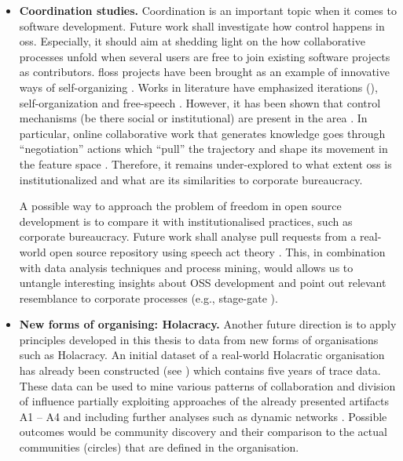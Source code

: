 \begin{itemize}
	\item{\bfseries Coordination studies.}
	Coordination is an important topic when it comes to software development. Future work shall investigate how control happens in \gls{oss}. Especially, it should aim at shedding light on the how collaborative processes unfold when several users are free to join existing software projects as contributors. \Gls{floss} projects have been brought as an example of innovative ways of self-organizing \citep{DBLP:journals/mansci/KroghH06,DBLP:journals/misq/HowisonC14}. Works in literature have emphasized iterations (\citealp{Berente2005,Berente2007}), self-organization \citep{DBLP:journals/infsof/CrowstonLWEH07,DBLP:journals/jss/HodaM16} and free-speech \citep{DBLP:conf/chiir/ThomasCMCM18,Gibson2019}. However, it has been shown that control mechanisms (be there social or institutional) are present in the area \citep{Lindberg2016}. In particular, online collaborative work that generates knowledge goes through ``negotiation'' actions which ``pull'' the trajectory and shape its movement in the feature space \citep{Arazy2020}. Therefore, it remains under-explored to what extent \gls{oss} is institutionalized and what are its similarities to corporate bureaucracy.
	
	A possible way to approach the problem of freedom in open source development is to compare it with institutionalised practices, such as corporate bureaucracy. Future work shall analyse pull requests from a real-world open source repository using speech act theory \citep{searle1985expression}. This, in combination with data analysis techniques and process mining, would allows us to untangle interesting insights about OSS development and point out relevant resemblance to corporate processes (e.g., stage-gate  \citep{cooper2008perspective}). 
	
	
	\item{\bfseries New forms of organising: Holacracy.}
	Another future direction is to apply principles developed in this thesis to data from new forms of organisations  such as Holacracy. An initial dataset of a real-world Holacratic organisation has already been constructed (see \citep{Wurm2021}) which contains five years of trace data. These data can be used to mine various patterns of collaboration and division of influence partially exploiting approaches of the already presented artifacts A1 – A4 and including further analyses such as dynamic networks \citep{DBLP:journals/csur/RossettiC18,DBLP:journals/corr/abs-0803-2093}. Possible outcomes would be community discovery and their comparison to the actual communities (circles) that are defined in the organisation.
	

\end{itemize}
